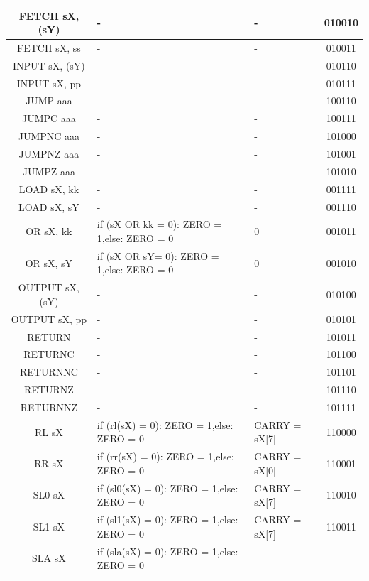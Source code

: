 \documentclass{scrartcl}
\begin{document}
\begin{longtable}{||c|p{6cm}|p{6cm}|c||}
    FETCH sX, (sY) & - & - & 010010 \\ \hline
    FETCH sX, ss & - & - & 010011 \\ \hline
    INPUT sX, (sY) & - & - & 010110 \\ \hline
    INPUT sX, pp & - & - & 010111 \\ \hline
    JUMP aaa & - & - & 100110 \\ \hline
    JUMPC aaa & - & - & 100111 \\ \hline
    JUMPNC aaa & - & - & 101000 \\ \hline
    JUMPNZ aaa & - & - & 101001 \\ \hline
    JUMPZ aaa & - & - & 101010 \\ \hline 
    LOAD sX, kk & - & - & 001111 \\ \hline
    LOAD sX, sY & - & - & 001110 \\ \hline 
    OR sX, kk & if (sX OR kk = 0): ZERO = 1,\newline else: ZERO = 0 & 0 & 001011 \\ \hline
    OR sX, sY & if (sX OR sY= 0): ZERO = 1,\newline else: ZERO = 0 & 0 & 001010 \\ \hline
    OUTPUT sX, (sY) & - & - & 010100 \\ \hline
    OUTPUT sX, pp & - & - & 010101 \\ \hline
    RETURN & - & - & 101011 \\ \hline
    RETURNC & - & - & 101100 \\ \hline
    RETURNNC & - & - & 101101 \\ \hline
    RETURNZ & - & - & 101110 \\ \hline
    RETURNNZ & - & - & 101111 \\ \hline
    RL sX & if (rl(sX) = 0): ZERO = 1,\newline else: ZERO = 0
    & CARRY = sX[7] & 110000 \\ \hline
    RR sX & if (rr(sX) = 0): ZERO = 1,\newline else: ZERO = 0
    & CARRY = sX[0] & 110001 \\ \hline
    SL0 sX & if (sl0(sX) = 0): ZERO = 1,\newline else: ZERO = 0
    & CARRY = sX[7] & 110010 \\ \hline
    SL1 sX & if (sl1(sX) = 0): ZERO = 1,\newline else: ZERO = 0
    & CARRY = sX[7] & 110011 \\ \hline
    SLA sX & if (sla(sX) = 0): ZERO = 1,\newline else: ZERO = 0

\end{longtable}
\end{document}
